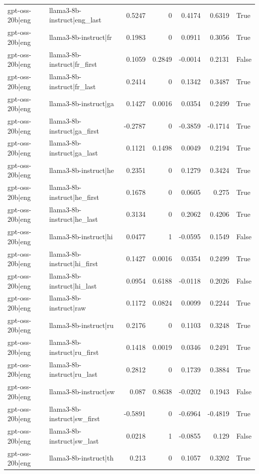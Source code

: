 \begin{table}
\begin{tabular}{l l r r r r l}
gpt-oss-20b|eng & llama3-8b-instruct|eng_last & 0.5247 & 0 & 0.4174 & 0.6319 & True \\
gpt-oss-20b|eng & llama3-8b-instruct|fr & 0.1983 & 0 & 0.0911 & 0.3056 & True \\
gpt-oss-20b|eng & llama3-8b-instruct|fr_first & 0.1059 & 0.2849 & -0.0014 & 0.2131 & False \\
gpt-oss-20b|eng & llama3-8b-instruct|fr_last & 0.2414 & 0 & 0.1342 & 0.3487 & True \\
gpt-oss-20b|eng & llama3-8b-instruct|ga & 0.1427 & 0.0016 & 0.0354 & 0.2499 & True \\
gpt-oss-20b|eng & llama3-8b-instruct|ga_first & -0.2787 & 0 & -0.3859 & -0.1714 & True \\
gpt-oss-20b|eng & llama3-8b-instruct|ga_last & 0.1121 & 0.1498 & 0.0049 & 0.2194 & True \\
gpt-oss-20b|eng & llama3-8b-instruct|he & 0.2351 & 0 & 0.1279 & 0.3424 & True \\
gpt-oss-20b|eng & llama3-8b-instruct|he_first & 0.1678 & 0 & 0.0605 & 0.275 & True \\
gpt-oss-20b|eng & llama3-8b-instruct|he_last & 0.3134 & 0 & 0.2062 & 0.4206 & True \\
gpt-oss-20b|eng & llama3-8b-instruct|hi & 0.0477 & 1 & -0.0595 & 0.1549 & False \\
gpt-oss-20b|eng & llama3-8b-instruct|hi_first & 0.1427 & 0.0016 & 0.0354 & 0.2499 & True \\
gpt-oss-20b|eng & llama3-8b-instruct|hi_last & 0.0954 & 0.6188 & -0.0118 & 0.2026 & False \\
gpt-oss-20b|eng & llama3-8b-instruct|raw & 0.1172 & 0.0824 & 0.0099 & 0.2244 & True \\
gpt-oss-20b|eng & llama3-8b-instruct|ru & 0.2176 & 0 & 0.1103 & 0.3248 & True \\
gpt-oss-20b|eng & llama3-8b-instruct|ru_first & 0.1418 & 0.0019 & 0.0346 & 0.2491 & True \\
gpt-oss-20b|eng & llama3-8b-instruct|ru_last & 0.2812 & 0 & 0.1739 & 0.3884 & True \\
gpt-oss-20b|eng & llama3-8b-instruct|sw & 0.087 & 0.8638 & -0.0202 & 0.1943 & False \\
gpt-oss-20b|eng & llama3-8b-instruct|sw_first & -0.5891 & 0 & -0.6964 & -0.4819 & True \\
gpt-oss-20b|eng & llama3-8b-instruct|sw_last & 0.0218 & 1 & -0.0855 & 0.129 & False \\
gpt-oss-20b|eng & llama3-8b-instruct|th & 0.213 & 0 & 0.1057 & 0.3202 & True \\

\end{tabular}
\end{table}
